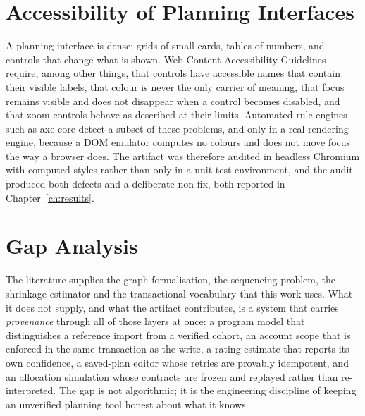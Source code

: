 \section{Accessibility of Planning Interfaces}

A planning interface is dense: grids of small cards, tables of numbers, and controls that change
what is shown. Web Content Accessibility Guidelines \cite{wcag22} require, among other things, that
controls have accessible names that contain their visible labels, that colour is never the only
carrier of meaning, that focus remains visible and does not disappear when a control becomes
disabled, and that zoom controls behave as described at their limits. Automated rule engines such
as axe-core \cite{axecore} detect a subset of these problems, and only in a real rendering engine,
because a DOM emulator computes no colours and does not move focus the way a browser does. The
artifact was therefore audited in headless Chromium with computed styles rather than only in a unit
test environment, and the audit produced both defects and a deliberate non-fix, both reported in
Chapter~\ref{ch:results}.

\section{Gap Analysis}

The literature supplies the graph formalisation, the sequencing problem, the shrinkage estimator
and the transactional vocabulary that this work uses. What it does not supply, and what the artifact
contributes, is a system that carries {\em provenance} through all of those layers at once: a
program model that distinguishes a reference import from a verified cohort, an account scope that
is enforced in the same transaction as the write, a rating estimate that reports its own
confidence, a saved-plan editor whose retries are provably idempotent, and an allocation simulation
whose contracts are frozen and replayed rather than re-interpreted. The gap is not algorithmic;
it is the engineering discipline of keeping an unverified planning tool honest about what it knows.
